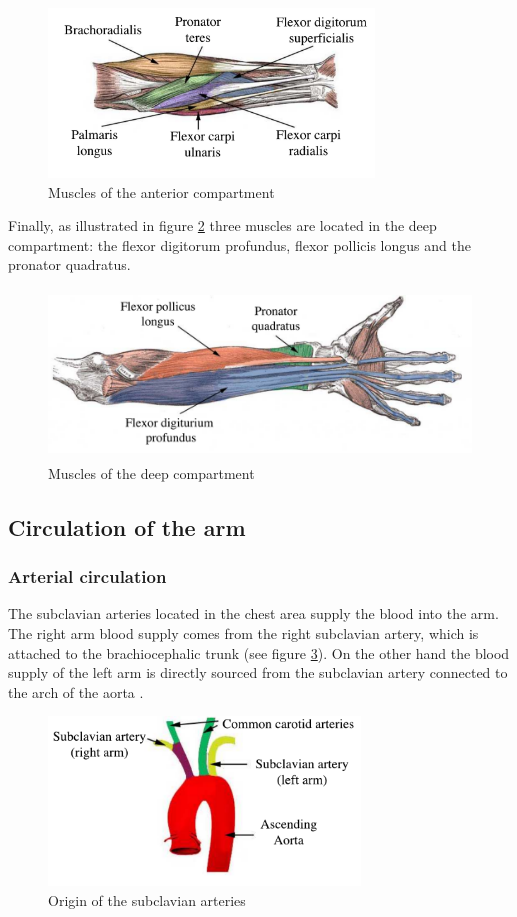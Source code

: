 \begin{figure}[!htpb]
	\centering
	\includegraphics[height=4.5cm,keepaspectratio]{figure16}
	\caption{Muscles of the anterior compartment}
	\label{fig:forearm anterior}
\end{figure}	

Finally, as illustrated in figure \ref{fig:forearm deep} three muscles are located in the deep compartment: the flexor digitorum profundus, flexor pollicis longus and the pronator quadratus.

\begin{figure}[!htpb]
	\centering
	\includegraphics[height=4.5cm,keepaspectratio]{figure17}
	\caption{Muscles of the deep compartment}
	\label{fig:forearm deep}
\end{figure}

\subsection{Circulation of the arm}
\subsubsection{Arterial circulation}
The subclavian arteries located in the chest area supply the blood into the arm.  The right arm blood supply comes from the right subclavian artery, which is attached to the brachiocephalic trunk (see figure \ref{fig:subcalvian}). On the other hand the blood supply of the left arm is directly sourced from the subclavian artery connected to the arch of the aorta \cite{scanlon2014essentials}. 

\begin{figure}[!htpb]
	\centering
	\includegraphics[height=4.5cm,keepaspectratio]{figure18}
	\caption{Origin of the subclavian arteries}
	\label{fig:subcalvian}
\end{figure}

